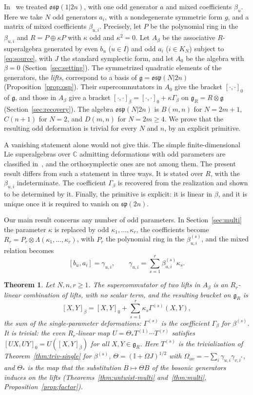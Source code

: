 \documentclass[11pt]{article}
\numberwithin{equation}{section}
\newtheorem{mainthm}{Theorem}
\theoremstyle{definition}
\theoremstyle{remark}
\newcommand{\osp}{\mathfrak{osp}}
\begin{document}
In~\cite{Aoi26} we treated $\osp(1|2n)$, with one odd generator $a$ and mixed
coefficients $\beta_u$. Here we take $N$ odd generators $a_i$, with a nondegenerate
symmetric form $g$, and a matrix of mixed coefficients $\beta_{u,i}$. Precisely, let $P$ be
the polynomial ring in the $\beta_{u,i}$ and $R=P\oplus\kappa P$ with $\kappa$ odd and
$\kappa^2=0$. Let $A_\beta$ be the associative $R$-superalgebra generated by even $b_u$ ($u\in I$) and odd
$a_i$ ($i\in K_N$) subject to \eqref{eq:source}, with $J$ the standard symplectic form, and let $A_0$ be the
algebra with $\beta=0$ (Section~\ref{sec:setting}). The symmetrized quadratic elements of the
generators, the \emph{lifts}, correspond to a basis of $\mathfrak g=\osp(N|2n)$
(Proposition~\ref{prop:osp}). Their supercommutators in $A_0$ give the bracket
$[\cdot,\cdot]_0$ of $\mathfrak g$, and those in $A_\beta$ give a bracket
$[\cdot,\cdot]_\beta=[\cdot,\cdot]_0+\kappa\Gamma_\beta$ on $\mathfrak g_R=R\otimes\mathfrak g$
(Section~\ref{sec:recovery}). The algebra $\osp(N|2n)$ is $B(m,n)$ for $N=2m+1$, $C(n+1)$ for
$N=2$, and $D(m,n)$ for $N=2m\geq4$. We prove that the resulting odd deformation is
trivial for every $N$ and $n$, by an explicit primitive.

A vanishing statement alone would not give this. The simple finite-dimensional Lie
superalgebras over $\mathbb C$ admitting deformations with odd parameters are
classified in~\cite[Theorem~7.1]{Lei23}, and the orthosymplectic ones are not among
them. The present result differs from such a statement in three ways. It is
stated over $R$, with the $\beta_{u,i}$ indeterminate. The
coefficient $\Gamma_\beta$ is recovered from the realization and shown to be
determined by it. Finally, the primitive is explicit: it is linear in $\beta$, and it is
unique once it is required to vanish on $\mathfrak{sp}(2n)$.

Our main result concerns any number of odd parameters. In Section~\ref{sec:multi} the parameter
$\kappa$ is replaced by odd $\kappa_1,\ldots,\kappa_r$, the coefficients become
$R_r=P_r\otimes\Lambda(\kappa_1,\ldots,\kappa_r)$, with $P_r$ the polynomial ring in the
$\beta^{(s)}_{u,i}$, and the mixed relation becomes
\[
 [b_u,a_i]=\gamma_{u,i},\qquad \gamma_{u,i}=\sum_{s=1}^r\beta^{(s)}_{u,i}\kappa_s .
\]

\begin{mainthm}\label{thm:A}
Let $N,n,r\geq1$. The supercommutator of two lifts in $A_\beta$ is an $R_r$-linear combination of lifts, with no
scalar term, and the resulting bracket on $\mathfrak g_R$ is
\[
 [X,Y]_\beta=[X,Y]_0+\sum_{s=1}^r\kappa_s\Gamma^{(s)}(X,Y),
\]
the sum of the single-parameter deformations: $\Gamma^{(s)}$ is the coefficient $\Gamma_\beta$
for $\beta^{(s)}$. It is trivial: the even $R_r$-linear map
$U=\Theta_*T^{(1)}\cdots T^{(r)}$ satisfies $[UX,UY]_0=U([X,Y]_\beta)$ for all
$X,Y\in\mathfrak g_R$. Here $T^{(s)}$ is the trivialization of Theorem~\ref{thm:triv-single} for $\beta^{(s)}$,
$\Theta=(\mathbb I+\Omega J)^{1/2}$ with $\Omega_{uv}=-\sum_i\gamma_{u,i}\gamma_{v,i^*}$, and
$\Theta_*$ is the map that the substitution $B\mapsto\Theta B$ of the bosonic generators induces
on the lifts
(Theorems~\ref{thm:untwist-multi} and~\ref{thm:multi}, Proposition~\ref{prop:factor}).
\end{mainthm}
\end{document}

